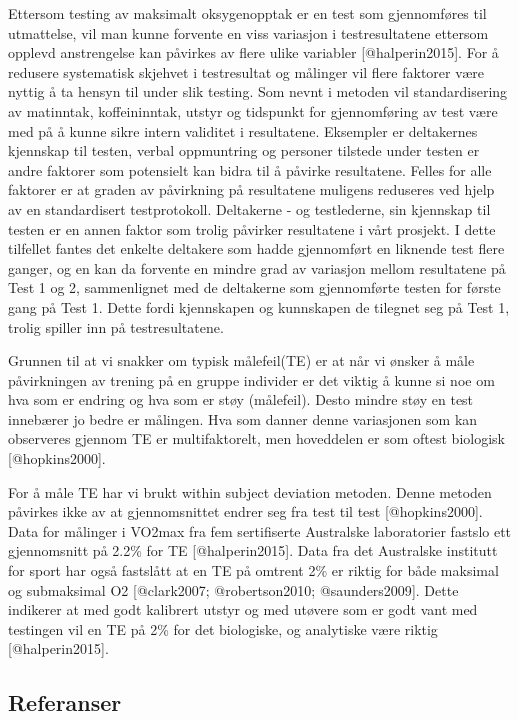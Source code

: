 \documentclass[
]{article}
\begin{document}
Ettersom testing av maksimalt oksygenopptak er en test som gjennomføres
til utmattelse, vil man kunne forvente en viss variasjon i
testresultatene ettersom opplevd anstrengelse kan påvirkes av flere
ulike variabler {[}@halperin2015{]}. For å redusere systematisk skjehvet
i testresultat og målinger vil flere faktorer være nyttig å ta hensyn
til under slik testing. Som nevnt i metoden vil standardisering av
matinntak, koffeininntak, utstyr og tidspunkt for gjennomføring av test
være med på å kunne sikre intern validitet i resultatene. Eksempler er
deltakernes kjennskap til testen, verbal oppmuntring og personer
tilstede under testen er andre faktorer som potensielt kan bidra til å
påvirke resultatene. Felles for alle faktorer er at graden av påvirkning
på resultatene muligens reduseres ved hjelp av en standardisert
testprotokoll. Deltakerne - og testlederne, sin kjennskap til testen er
en annen faktor som trolig påvirker resultatene i vårt prosjekt. I dette
tilfellet fantes det enkelte deltakere som hadde gjennomført en liknende
test flere ganger, og en kan da forvente en mindre grad av variasjon
mellom resultatene på Test 1 og 2, sammenlignet med de deltakerne som
gjennomførte testen for første gang på Test 1. Dette fordi kjennskapen
og kunnskapen de tilegnet seg på Test 1, trolig spiller inn på
testresultatene.

Grunnen til at vi snakker om typisk målefeil(TE) er at når vi ønsker å
måle påvirkningen av trening på en gruppe individer er det viktig å
kunne si noe om hva som er endring og hva som er støy (målefeil). Desto
mindre støy en test innebærer jo bedre er målingen. Hva som danner denne
variasjonen som kan observeres gjennom TE er multifaktorelt, men
hoveddelen er som oftest biologisk {[}@hopkins2000{]}.

For å måle TE har vi brukt within subject deviation metoden. Denne
metoden påvirkes ikke av at gjennomsnittet endrer seg fra test til test
{[}@hopkins2000{]}. Data for målinger i VO2max fra fem sertifiserte
Australske laboratorier fastslo ett gjennomsnitt på 2.2\% for TE
{[}@halperin2015{]}. Data fra det Australske institutt for sport har
også fastslått at en TE på omtrent 2\% er riktig for både maksimal og
submaksimal O2 {[}@clark2007; @robertson2010; @saunders2009{]}. Dette
indikerer at med godt kalibrert utstyr og med utøvere som er godt vant
med testingen vil en TE på 2\% for det biologiske, og analytiske være
riktig {[}@halperin2015{]}.

\hypertarget{referanser}{%
\subsection{Referanser}\label{referanser}}
\end{document}
